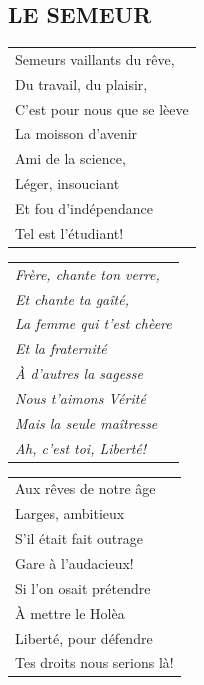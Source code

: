 \documentclass[a4paper, 14pt]{extarticle}
\begin{document}
\subsection*{LE SEMEUR}
\begin{flushleft}
\begin{tabularx}{0.7\textwidth} {
   >{\raggedright\arraybackslash}X }
Semeurs vaillants du rêve,\\
Du travail, du plaisir,\\
C’est pour nous que se lèeve\\
La moisson d’avenir\\
Ami de la science,\\
Léger, insouciant\\
Et fou d’indépendance\\
Tel est l’étudiant!\\
\end{tabularx}
\end{flushleft}
\begin{flushleft}
\begin{tabularx}{0.7\textwidth} {
   >{\raggedright\arraybackslash}X }
\textit{Frère, chante ton verre,}\\
\textit{Et chante ta gaîté,}\\
\textit{La femme qui t’est chèere}\\
\textit{Et la fraternité}\\
\textit{À d’autres la sagesse}\\
\textit{Nous t’aimons Vérité}\\
\textit{Mais la seule maîtresse}\\
\textit{Ah, c’est toi, Liberté!}\\
\end{tabularx}
\end{flushleft}
\begin{flushleft}
\begin{tabularx}{0.7\textwidth} {
   >{\raggedright\arraybackslash}X }
Aux rêves de notre âge\\
Larges, ambitieux\\
S’il était fait outrage\\
Gare à l’audacieux!\\
Si l’on osait prétendre\\
À mettre le Holèa\\
Liberté, pour défendre\\
Tes droits nous serions là!\\
\end{tabularx}
\end{flushleft}
\end{document}
